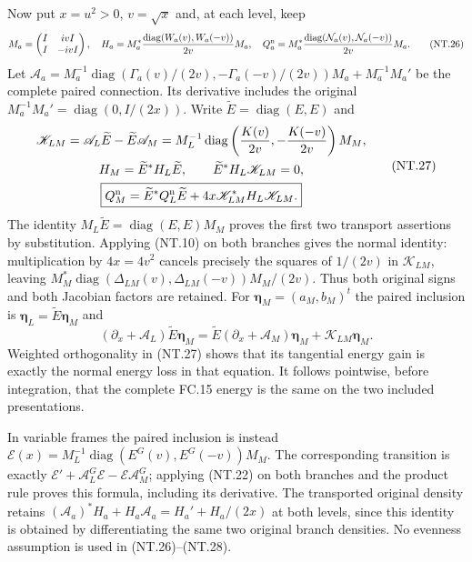 \documentclass[11pt]{article}
\newcommand{\diag}{\operatorname{diag}}
\begin{document}
Now put $x=u^2>0$, $v=\sqrt x$ and, at each level, keep
\[
 M_a=\begin{pmatrix}I&ivI\\ I&-ivI\end{pmatrix},\quad
 H_a=M_a^*\frac{\diag(W_a(v),W_a(-v))}{2v}M_a,\quad
 Q_a^{\rm n}=M_a^*\frac{\diag(\mathcal N_a(v),\mathcal N_a(-v))}{2v}M_a.
 \tag{NT.26}
\]
Let $\mathscr A_a=M_a^{-1}
\diag(\Gamma_a(v)/(2v),-\Gamma_a(-v)/(2v))M_a+M_a^{-1}M_a'$
be the complete paired connection. Its derivative includes the
original $M_a^{-1}M_a'=\diag(0,I/(2x))$.
Write $\widetilde E=\diag(E,E)$ and
\[
 \begin{gathered}
 \mathscr K_{LM}=\mathscr A_L\widetilde E
                       -\widetilde E\mathscr A_M
   =M_L^{-1}\diag\left(\frac{K(v)}{2v},
                            -\frac{K(-v)}{2v}\right)M_M,\\
 H_M=\widetilde E^*H_L\widetilde E,\qquad
 \widetilde E^*H_L\mathscr K_{LM}=0,\\
 \boxed{Q_M^{\rm n}=\widetilde E^*Q_L^{\rm n}\widetilde E
                   +4x\mathscr K_{LM}^*H_L\mathscr K_{LM}.}
 \end{gathered}
 \tag{NT.27}
\]
The identity $M_L\widetilde E=\diag(E,E)M_M$ proves the
first two transport assertions by substitution. Applying (NT.10)
on both branches gives the normal identity: multiplication by
$4x=4v^2$ cancels precisely the squares of $1/(2v)$ in
$\mathscr K_{LM}$, leaving
$M_M^*\diag(\Delta_{LM}(v),\Delta_{LM}(-v))M_M/(2v)$.
Thus both original signs and both Jacobian factors are retained.
For $\boldsymbol\eta_M=(a_M,b_M)^t$ the paired inclusion is
$\boldsymbol\eta_L=\widetilde E\boldsymbol\eta_M$ and
\[
 (\partial_x+\mathscr A_L)\widetilde E\boldsymbol\eta_M
   =\widetilde E(\partial_x+\mathscr A_M)\boldsymbol\eta_M
                               +\mathscr K_{LM}\boldsymbol\eta_M.
 \tag{NT.28}
\]
Weighted orthogonality in (NT.27) shows that its tangential energy
gain is exactly the normal energy loss in that equation. It follows
pointwise, before integration, that the complete FC.15 energy is
the same on the two included presentations.

In variable frames the paired inclusion is instead
$\mathscr E(x)=M_L^{-1}\diag(E^G(v),E^G(-v))M_M$.
The corresponding transition is exactly
$\mathscr E'+\mathscr A_L^G\mathscr E-
\mathscr E\mathscr A_M^G$; applying (NT.22) on both branches
and the product rule proves this formula, including its derivative.
The transported original density retains
$(\mathscr A_a)^*H_a+H_a\mathscr A_a=H_a'+H_a/(2x)$
at both levels, since this identity is obtained by differentiating
the same two original branch densities. No evenness assumption
is used in (NT.26)--(NT.28).
\end{document}
